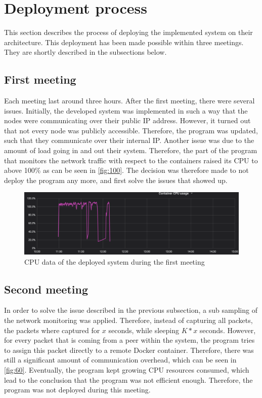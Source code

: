 \section{Deployment process} \label{sec:sb-process}
This section describes the process of deploying the implemented system on their architecture. This deployment has been made possible within three meetings. They are shortly described in the subsections below.

\subsection{First meeting}
Each meeting last around three hours. After the first meeting, there were several issues. Initially, the developed system was implemented in such a way that the nodes were communicating over their public IP address. However, it turned out that not every node was publicly accessible. Therefore, the program was updated, such that they communicate over their internal IP. Another issue was due to the amount of load going in and out their system. Therefore, the part of the program that monitors the network traffic with respect to the containers raised its CPU to above 100\% as can be seen in \autoref{fig:100}.
The decision was therefore made to not deploy the program any more, and first solve the issues that showed up.

\begin{figure}
    \centering
    \includegraphics[width=\textwidth]{gfx/load-100.png}
    \caption{CPU data of the deployed system during the first meeting}
    \label{fig:100}
\end{figure}

\subsection{Second meeting}
In order to solve the issue described in the previous subsection, a sub sampling of the network monitoring was applied. Therefore, instead of capturing all packets, the packets where captured for $x$ seconds, while sleeping $K*x$ seconds. However, for every packet that is coming from a peer within the system, the program tries to assign this packet directly to a remote Docker container. Therefore, there was still a significant amount of communication overhead, which can be seen in \autoref{fig:60}. Eventually, the program kept growing CPU resources consumed, which lead to the conclusion that the program was not efficient enough. Therefore, the program was not deployed during this meeting.

